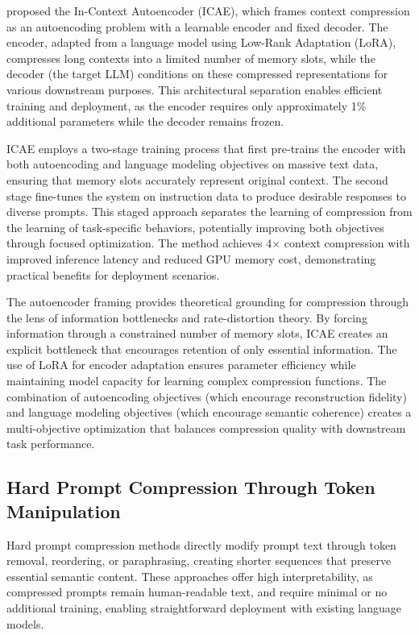 \citet{ge2024icae} proposed the In-Context Autoencoder (ICAE), which frames context compression as an autoencoding problem with a learnable encoder and fixed decoder. The encoder, adapted from a language model using Low-Rank Adaptation (LoRA), compresses long contexts into a limited number of memory slots, while the decoder (the target LLM) conditions on these compressed representations for various downstream purposes. This architectural separation enables efficient training and deployment, as the encoder requires only approximately 1\% additional parameters while the decoder remains frozen.

ICAE employs a two-stage training process that first pre-trains the encoder with both autoencoding and language modeling objectives on massive text data, ensuring that memory slots accurately represent original context. The second stage fine-tunes the system on instruction data to produce desirable responses to diverse prompts. This staged approach separates the learning of compression from the learning of task-specific behaviors, potentially improving both objectives through focused optimization. The method achieves 4$\times$ context compression with improved inference latency and reduced GPU memory cost, demonstrating practical benefits for deployment scenarios.

The autoencoder framing provides theoretical grounding for compression through the lens of information bottlenecks and rate-distortion theory. By forcing information through a constrained number of memory slots, ICAE creates an explicit bottleneck that encourages retention of only essential information. The use of LoRA for encoder adaptation ensures parameter efficiency while maintaining model capacity for learning complex compression functions. The combination of autoencoding objectives (which encourage reconstruction fidelity) and language modeling objectives (which encourage semantic coherence) creates a multi-objective optimization that balances compression quality with downstream task performance.

\subsection{Hard Prompt Compression Through Token Manipulation}

Hard prompt compression methods directly modify prompt text through token removal, reordering, or paraphrasing, creating shorter sequences that preserve essential semantic content. These approaches offer high interpretability, as compressed prompts remain human-readable text, and require minimal or no additional training, enabling straightforward deployment with existing language models.

